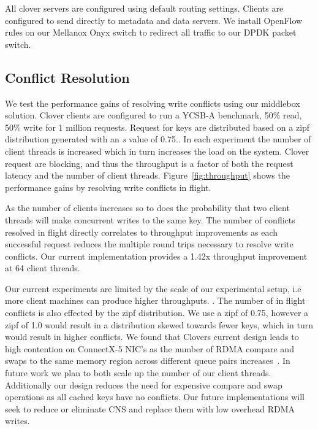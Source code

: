 All clover servers are configured using default routing settings.
Clients are configured to send directly to metadata and data servers.
We install OpenFlow rules on our Mellanox Onyx switch to redirect all
traffic to our DPDK packet switch.

\subsection{Conflict Resolution}

We test the performance gains of resolving write conflicts using our
middlebox solution. Clover clients are configured to run a YCSB-A
benchmark, 50\% read, 50\% write for 1 million requests. Request for
keys are distributed based on a zipf distribution generated with an
\textit{s} value of 0.75.. In each
experiment the number of client threads is increased which in turn
increases the load on the system. Clover request are blocking, and
thus the throughput is a factor of both the request latency and the
number of client threads. Figure~\ref{fig:throughput} shows the
performance gains by resolving write conflicts in flight.

As the number of clients increases so to does the probability that two
client threads will make concurrent writes to the same key. The number
of conflicts resolved in flight directly correlates to throughput
improvements as each successful request reduces the multiple round
trips necessary to resolve write conflicts. Our current implementation
provides a 1.42x throughput improvement at 64 client threads.

Our current experiments are limited by the scale of our experimental
setup, i.e more client machines can produce higher throughputs.
. 
The number of in flight conflicts is also effected by the zipf
distribution. We use a zipf of 0.75, however a zipf of 1.0 would
result in a distribution skewed towards fewer keys, which in turn
would result in higher conflicts. We found that Clovers current design
leads to high contention on ConnectX-5 NIC's as the number of RDMA
compare and swaps to the same memory region across different queue
pairs increases~\cite{design-guidelines}. In future work we plan to
both scale up the number of our client threads. Additionally our
design reduces the need for expensive compare and swap operations as
all cached keys have no conflicts. Our future implementations will
seek to reduce or eliminate CNS and replace them with low overhead
RDMA writes.


